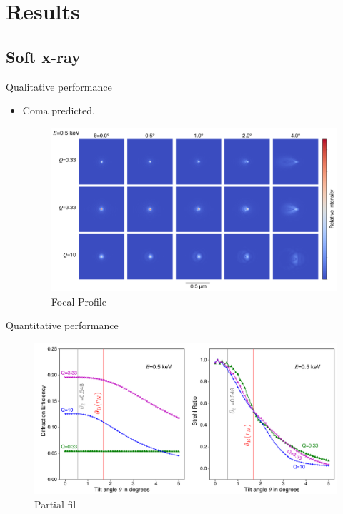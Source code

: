 \documentclass{beamer}
\begin{document}
\section{Results}
\subsection{Soft x-ray}
\begin{frame}{Qualitative performance}
	\begin{itemize}
		\item Coma predicted.
		\begin{center}
			\begin{figure}
				\includegraphics[scale=0.29]{foc_spot_half}
				\caption{Focal Profile}
			\end{figure}
		\end{center}
	\end{itemize}
\end{frame}

\begin{frame}{Quantitative performance}
		\begin{center}
			\begin{figure}
				\includegraphics[scale=0.4]{tilt_plot_half}
				\caption{Partial fil}	
			\end{figure}
		\end{center}
\end{frame}
\end{document}
